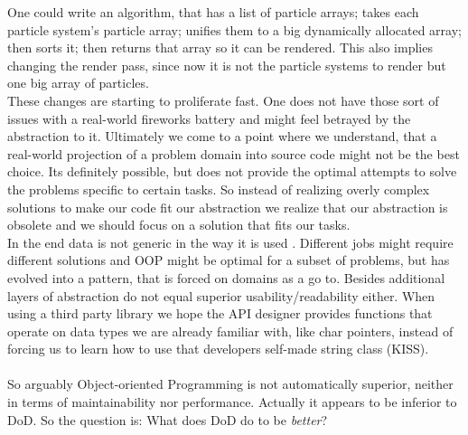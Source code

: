 One could write an algorithm, that has a list of particle arrays; takes each particle system's particle array; unifies them to a big dynamically allocated array; then sorts it; then returns that array so it can be rendered. This also implies changing the render pass, since now it is not the particle systems to render but one big array of particles.\\
These changes are starting to proliferate fast. One does not have those sort of issues with a real-world fireworks battery and might feel betrayed by the abstraction to it. Ultimately we come to a point where we understand, that a real-world projection of a problem domain into source code might not be the best choice. Its definitely possible, but does not provide the optimal attempts to solve the problems specific to certain tasks. So instead of realizing overly complex solutions to make our code fit our abstraction we realize that our abstraction is obsolete and we should focus on a solution that fits our tasks.\\
In the end data is not generic in the way it is used . Different jobs might require different solutions and OOP might be optimal for a subset of problems, but has evolved into a pattern, that is forced on domains as a go to. Besides additional layers of abstraction do not equal superior usability/readability either. When using a third party library we hope the API designer provides functions that operate on data types we are already familiar with, like char pointers, instead of forcing us to learn how to use that developers self-made string class (KISS).\\\\
So arguably Object-oriented Programming is not automatically superior, neither in terms of maintainability nor performance. Actually it appears to be inferior to DoD. So the question is: What does DoD do to be \textit{better}?\newpage
